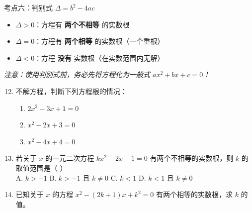 \documentclass[12pt, a4paper]{article}
\begin{document}
\begin{conceptbox}{考点六：判别式 $\Delta = b^2 - 4ac$}
    \begin{itemize}
        \item $\Delta > 0$：方程有 \textbf{两个不相等} 的实数根
        \item $\Delta = 0$：方程有 \textbf{两个相等} 的实数根（一个重根）
        \item $\Delta < 0$：方程 \textbf{没有} 实数根（在实数范围内无解）
    \end{itemize}
    \textit{注意：使用判别式前，务必先将方程化为一般式 $ax^2 + bx + c = 0$！}
\end{conceptbox}

\begin{examplebox}
    \begin{enumerate}[label=\textbf{例\arabic*.}]
        \setcounter{enumi}{11}
        \item 不解方程，判断下列方程根的情况：
        \begin{enumerate}
            \item[(1)] $2x^2 - 3x + 1 = 0$
            \item[(2)] $x^2 - 2x + 3 = 0$
            \item[(3)] $x^2 - 4x + 4 = 0$
        \end{enumerate}
        
        \item 若关于 $x$ 的一元二次方程 $kx^2 - 2x - 1 = 0$ 有两个不相等的实数根，则 $k$ 的取值范围是（ \quad ）\\
        A. $k > -1$ \quad B. $k > -1$ 且 $k \neq 0$ \quad C. $k < 1$ \quad D. $k < 1$ 且 $k \neq 0$
        
        \item 已知关于 $x$ 的方程 $x^2 - (2k+1)x + k^2 = 0$ 有两个相等的实数根，求 $k$ 的值。
    \end{enumerate}
\end{examplebox}
\end{document}
